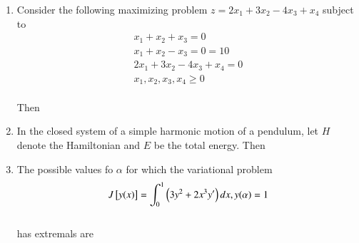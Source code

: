 \documentclass[journal,12pt,onecolumn]{IEEEtran}
\theoremstyle{remark}
\begin{document}
\begin{enumerate}
\item Consider the following maximizing problem $z=2x_1+3x_2-4x_3+x_4$ subject to 
\begin{align}
    x_1+x_2+ x_3=0 \\
  x_1+x_2-x_3=0 = 10 \\
   2x_1+3x_2-4x_3+x_4=0 \\
   x_1,x_2,x_3,x_4\geq0
\end{align}\\
Then
\begin{enumerate}
\end{enumerate}

\item In the closed system of a simple harmonic motion of a  pendulum, let $H$ denote the Hamiltonian and $E$ be the total energy. Then
\begin{enumerate}
\end{enumerate}

\item The possible values fo $\alpha$ for which the variational problem
\begin{align}
    J{}\left[y(x)\right] = \int_{0}^{1} \left(3y^2 + 2x^3 y'\right)dx, y(\alpha) = 1
\end{align}\\
has extremals are
\begin{enumerate}
\end{enumerate}


\end{enumerate}
\end{document}
